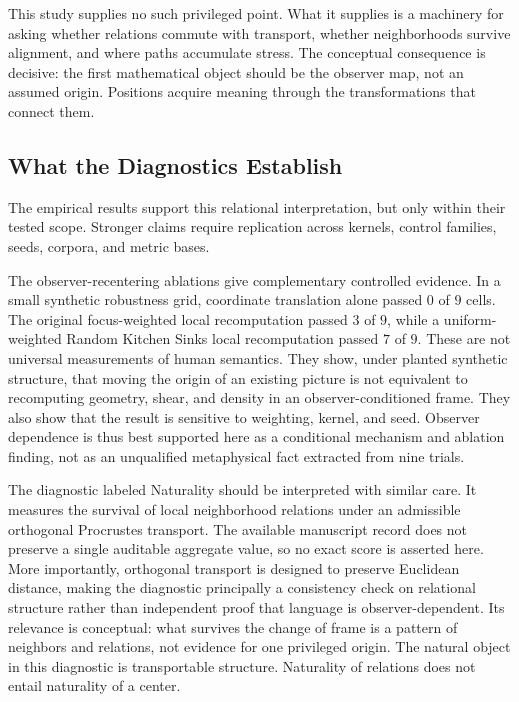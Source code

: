 This study supplies no such privileged point. What it supplies is a machinery for asking whether relations commute with transport, whether neighborhoods survive alignment, and where paths accumulate stress. The conceptual consequence is decisive: the first mathematical object should be the observer map, not an assumed origin. Positions acquire meaning through the transformations that connect them.

\subsection{What the Diagnostics Establish}

The empirical results support this relational interpretation, but only within their tested scope. Stronger claims require replication across kernels, control families, seeds, corpora, and metric bases.

The observer-recentering ablations give complementary controlled evidence. In a small synthetic robustness grid, coordinate translation alone passed $0$ of $9$ cells. The original focus-weighted local recomputation passed $3$ of $9$, while a uniform-weighted Random Kitchen Sinks local recomputation passed $7$ of $9$. These are not universal measurements of human semantics. They show, under planted synthetic structure, that moving the origin of an existing picture is not equivalent to recomputing geometry, shear, and density in an observer-conditioned frame. They also show that the result is sensitive to weighting, kernel, and seed. Observer dependence is thus best supported here as a conditional mechanism and ablation finding, not as an unqualified metaphysical fact extracted from nine trials.

The diagnostic labeled Naturality should be interpreted with similar care. It measures the survival of local neighborhood relations under an admissible orthogonal Procrustes transport. The available manuscript record does not preserve a single auditable aggregate value, so no exact score is asserted here. More importantly, orthogonal transport is designed to preserve Euclidean distance, making the diagnostic principally a consistency check on relational structure rather than independent proof that language is observer-dependent. Its relevance is conceptual: what survives the change of frame is a pattern of neighbors and relations, not evidence for one privileged origin. The natural object in this diagnostic is transportable structure. Naturality of relations does not entail naturality of a center.

